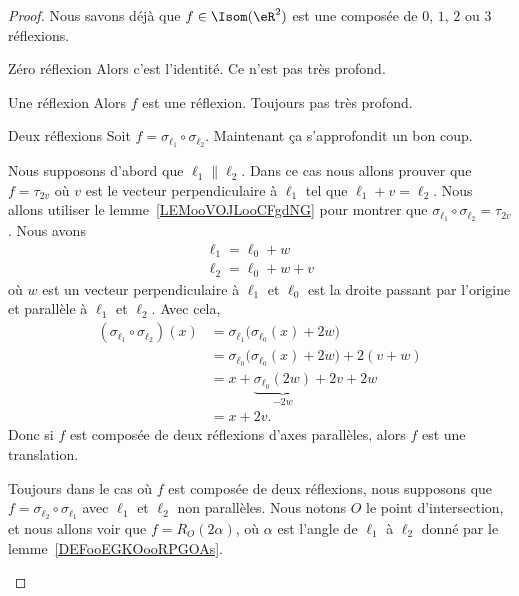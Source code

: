 \begin{proof}
	Nous savons déjà que \( f\in \Isom(\eR^2)\) est une composée de \( 0\), \( 1\), \( 2\) ou \( 3\) réflexions.
	\begin{subproof}
		\item[Zéro réflexion]
		Alors c'est l'identité. Ce n'est pas très profond.
		\item[Une réflexion]
		Alors \( f\) est une réflexion. Toujours pas très profond.
		\item[Deux réflexions]
		Soit \( f=\sigma_{\ell_1}\circ\sigma_{\ell_2}\). Maintenant ça s'approfondit un bon coup.

		Nous supposons d'abord que \( \ell_1\parallel\ell_2\). Dans ce cas nous allons prouver que \( f=\tau_{2v}\) où \( v\) est le vecteur perpendiculaire à \(  \ell_1 \) tel que \( \ell_1+v=\ell_2\). Nous allons utiliser le lemme~\ref{LEMooVOJLooCFgdNG} pour montrer que \( \sigma_{\ell_1}\circ\sigma_{\ell_2}=\tau_{2v}\). Nous avons
		\begin{subequations}
			\begin{align}
				\ell_1=\ell_0+w \\
				\ell_2=\ell_0+w+v
			\end{align}
		\end{subequations}
		où \( w\) est un vecteur perpendiculaire à \( \ell_1\) et \( \ell_0\) est la droite passant par l'origine et parallèle à \( \ell_1\) et \( \ell_2\). Avec cela,
		\begin{subequations}
			\begin{align}
				(\sigma_{\ell_1}\circ\sigma_{\ell_2})(x) & =\sigma_{\ell_1}\big( \sigma_{\ell_0}(x)+2w \big)        \\
				                                         & =\sigma_{\ell_0}\big( \sigma_{\ell_0}(x)+2w \big)+2(v+w) \\
				                                         & =x+\underbrace{\sigma_{\ell_0}(2w)}_{-2w}+2v+2w          \\
				                                         & =x+2v.
			\end{align}
		\end{subequations}
		Donc si \( f\) est composée de deux réflexions d'axes parallèles, alors \( f\) est une translation.

		Toujours dans le cas où \( f\) est composée de deux réflexions, nous supposons que \( f=\sigma_{\ell_2}\circ\sigma_{\ell_1}\) avec \( \ell_1\) et \( \ell_2\) non parallèles. Nous notons \( O\) le point d'intersection, et nous allons voir que \( f=R_O(2\alpha)\), où \( \alpha\) est l'angle de \( \ell_1\) à \( \ell_2\) donné par le lemme~\ref{DEFooEGKOooRPGOAs}.


\end{subproof}
\end{proof}
